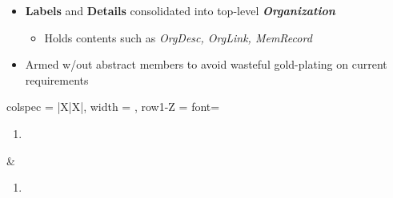\documentclass[7px]{article}
\begin{document}
\deploy
{
  \begin{itemize}
    \small
    \item \textbf{Labels} and \textbf{Details} consolidated into top-level \textbf{\textsl{Organization}}
      \begin{itemize}[label=\blitzb]
        \small
        \item Holds contents such as \textsl{OrgDesc, OrgLink, MemRecord}
      \end{itemize}
    \item Armed w/out abstract members to avoid wasteful gold-plating on current requirements
      \normalsize
  \end{itemize}
}
{
  \raggedright
  \begin{tblr}{
      colspec = {|X|X|}, width = \linewidth,
      row{1-Z} = {font=\scriptsize}
    }
    {
      \begin{minipage}[t]{\linewidth}
        \vspace{-2.3em}
        \begin{enumerate}
          \item 
        \end{enumerate}
      \end{minipage}
    } & {
      \begin{minipage}[t]{\linewidth}
        \vspace{-2.3em}
        \begin{enumerate}
          \item 
        \end{enumerate}
      \end{minipage}
    } \\
  \end{tblr}
}
\end{document}
